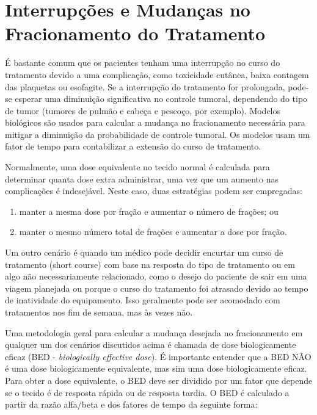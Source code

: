 \documentclass[11pt,a4paper]{article}
\newcounter{exemplo}
\begin{document}
\section{Interrupções e Mudanças no Fracionamento do Tratamento}

	É bastante comum que os pacientes tenham uma interrupção no curso do tratamento devido a uma complicação, como toxicidade cutânea, baixa contagem das plaquetas ou esofagite. Se a interrupção do tratamento for prolongada, pode-se esperar uma diminuição significativa no controle tumoral, dependendo do tipo de tumor (tumores de pulmão e cabeça e pescoço, por exemplo). Modelos biológicos são usados para calcular a mudança no fracionamento necessária para mitigar a diminuição da probabilidade de controle tumoral. Os modelos usam um fator de tempo para contabilizar a extensão do curso de tratamento.
	
	Normalmente, uma dose equivalente no tecido normal é calculada para determinar quanta dose extra administrar, uma vez que um aumento nas complicações é indesejável. Neste caso, duas estratégias podem ser empregadas:

	\begin{enumerate}[label=\textcolor{CarnationPink}{(\roman*)}]
		\item manter a mesma dose por fração e aumentar o número de frações; ou
		\item manter o mesmo número total de frações e aumentar a dose por fração.
	\end{enumerate}

	Um outro cenário é quando um médico pode decidir encurtar um curso de tratamento (short course) com base na resposta do tipo de tratamento ou em algo não necessariamente relacionado, como o desejo do paciente de sair em uma viagem planejada ou porque o curso do tratamento foi atrasado devido ao tempo de inatividade do equipamento. Isso geralmente pode ser acomodado com tratamentos nos fim de semana, mas às vezes não.

	Uma metodologia geral para calcular a mudança desejada no fracionamento em qualquer um dos cenários discutidos acima é chamada de dose biologicamente eficaz (BED - \textit{biologically effective dose}). É importante entender que a BED NÃO é uma dose biologicamente equivalente, mas sim uma dose biologicamente eficaz. Para obter a dose equivalente, o BED deve ser dividido por um fator que depende se o tecido é de resposta rápida ou de resposta tardia. %
	O BED é calculado a partir da razão alfa/beta e dos fatores de tempo da seguinte forma:
\end{document}
